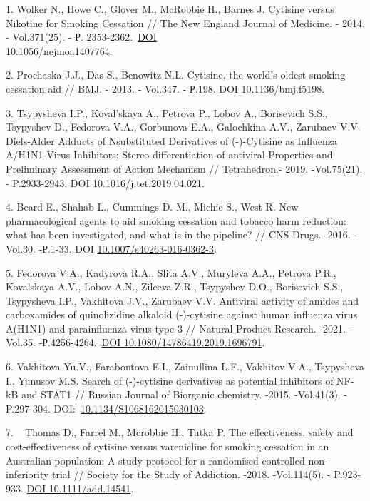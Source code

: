 \begin{refs}
1. Wolker N., Howe C., Glover M., McRobbie H., Barnes J. Cytisine versus
Nikotine for Smoking Cessation // The New England Journal of Medicine. -
2014. - Vol.371(25). - Р.
2353-2362.~\href{https://doi.org/10.1056/nejmoa1407764}{DOI\\
10.1056/nejmoa1407764}.

2. Prochaska J.J., Das S., Benowitz N.L. Cytisine, the world's oldest
smoking cessation aid // BMJ. ­- 2013. - Vol.347. - Р.198. DOI
10.1136/bmj.f5198.

3. Tsypysheva I.P., Koval'skaya A., Petrova P., Lobov A., Borisevich
S.S., Tsypyshev D., Fedorova V.A., Gorbunova E.A., Galochkina A.V.,
Zarubaev V.V. Diels-Alder Adducts of Nsubstituted Derivatives of
(-)-Cytisine as Influenza A/H1N1 Virus Inhibitors; Stereo
differentiation of antiviral Properties and Preliminary Assessment of
Action Mechanism // Tetrahedron.- 2019. -Vol.75(21). - P.2933-2943.
DOI
\href{https://doi.org/10.1016/j.tet.2019.04.021}{10.1016/j.tet.2019.04.021}.

4. Beard E., Shahab L., Cummings D. M., Michie S., West R. New
pharmacological agents to aid smoking cessation and tobacco harm
reduction: what has been investigated, and what is in the pipeline? //
CNS Drugs. -2016. -Vol.30. -Р.1-33. DOI
\href{https://doi.org/10.1007/s40263-016-0362-3}{10.1007/s40263-016-0362-3}.

5. Fedorova V.A., Kadyrova R.A., Slita A.V., Muryleva A.A., Petrova
P.R., Kovalskaya A.V., Lobov A.N., Zileeva Z.R., Tsypyshev D.O.,
Borisevich S.S., Tsypysheva I.P., Vakhitova J.V., Zarubaev V.V.
Antiviral activity of amides and carboxamides of quinolizidine alkaloid
(-)-cytisine against human influenza virus A(H1N1) and parainfluenza
virus type 3 // Natural Product Research. -2021. -- Vol.35.
-Р.4256-4264.~\href{https://doi.org/10.1080/14786419.2019.1696791}{DOI
10.1080/14786419.2019.1696791}.

6. Vakhitova Yu.V., Farabontova E.I., Zainullina L.F., Vakhitov V.A.,
Tsypysheva I., Yunusov M.S. Search of (-)-cytisine derivatives as
potential inhibitors of NF-kB and STAT1 // Russian Journal of Biorganic
chemistry. -2015. -Vol.41(3). - P.297-304.
DOI:~\href{http://dx.doi.org/10.1134/S1068162015030103}{10.1134/S1068162015030103}.

7. ~ Thomas D., Farrel M., Mcrobbie H., Tutka P. The effectiveness,
safety and cost-effectiveness of cytisine versus varenicline for smoking
cessation in an Australian population: A study protocol for a randomised
controlled non-inferiority trial // Society for the Study of Addiction.
-2018. -Vol.114(5). - P.923-933.
\href{https://doi.org/10.1111/add.14541}{DOI 10.1111/add.14541}.


\end{refs}
